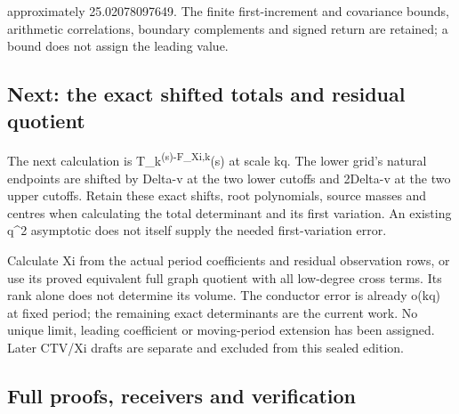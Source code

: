 \documentclass[
]{article}
\begin{document}
approximately 25.02078097649. The finite first-increment and covariance
bounds, arithmetic correlations, boundary complements and signed return
are retained; a bound does not assign the leading value.

\subsection{Next: the exact shifted totals and residual
quotient}\label{next-the-exact-shifted-totals-and-residual-quotient}

The next calculation is T\_k\textsuperscript{(s)-F\_Xi,k}(s) at scale
kq. The lower grid's natural endpoints are shifted by Delta-v at the two
lower cutoffs and 2Delta-v at the two upper cutoffs. Retain these exact
shifts, root polynomials, source masses and centres when calculating the
total determinant and its first variation. An existing q\^{}2 asymptotic
does not itself supply the needed first-variation error.

Calculate Xi from the actual period coefficients and residual
observation rows, or use its proved equivalent full graph quotient with
all low-degree cross terms. Its rank alone does not determine its
volume. The conductor error is already o(kq) at fixed period; the
remaining exact determinants are the current work. No unique limit,
leading coefficient or moving-period extension has been assigned. Later
CTV/Xi drafts are separate and excluded from this sealed edition.

\subsection{Full proofs, receivers and
verification}\label{full-proofs-receivers-and-verification}
\end{document}
